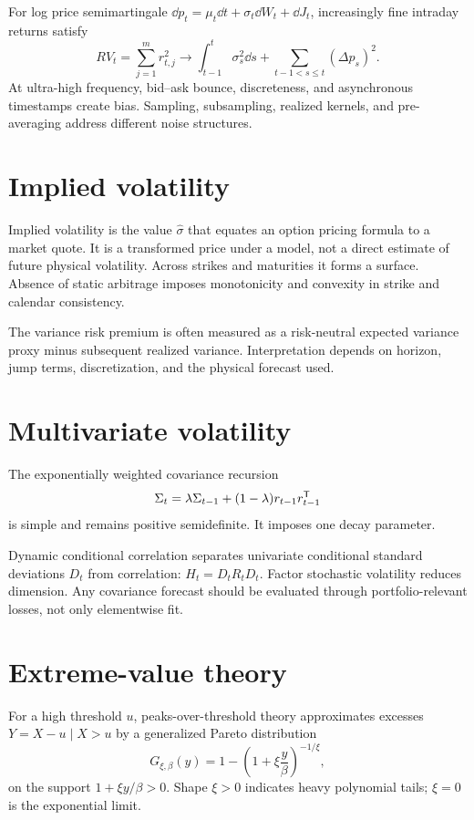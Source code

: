 For log price semimartingale
$\dd p_t=\mu_t\dd t+\sigma_t\dd W_t+\dd J_t$, increasingly fine intraday returns
satisfy
\[
RV_t=\sum_{j=1}^m r_{t,j}^2
\longrightarrow
\int_{t-1}^t\sigma_s^2\dd s+\sum_{t-1<s\leq t}(\Delta p_s)^2.
\]
At ultra-high frequency, bid--ask bounce, discreteness, and asynchronous timestamps
create bias. Sampling, subsampling, realized kernels, and pre-averaging address
different noise structures.

\section{Implied volatility}

Implied volatility is the value $\widehat\sigma$ that equates an option pricing
formula to a market quote. It is a transformed price under a model, not a direct
estimate of future physical volatility. Across strikes and maturities it forms a
surface. Absence of static arbitrage imposes monotonicity and convexity in strike and
calendar consistency.

The variance risk premium is often measured as a risk-neutral expected variance
proxy minus subsequent realized variance. Interpretation depends on horizon, jump
terms, discretization, and the physical forecast used.

\section{Multivariate volatility}

The exponentially weighted covariance recursion
\[
\Sigma_t=\lambda\Sigma_{t-1}
+(1-\lambda)r_{t-1}r_{t-1}^\mathsf T
\]
is simple and remains positive semidefinite. It imposes one decay parameter.

Dynamic conditional correlation separates univariate conditional standard
deviations $D_t$ from correlation:
$H_t=D_tR_tD_t$. Factor stochastic volatility reduces dimension. Any covariance
forecast should be evaluated through portfolio-relevant losses, not only elementwise
fit.

\section{Extreme-value theory}

For a high threshold $u$, peaks-over-threshold theory approximates excesses
$Y=X-u\mid X>u$ by a generalized Pareto distribution
\[
G_{\xi,\beta}(y)=
1-\left(1+\xi\frac y\beta\right)^{-1/\xi},
\]
on the support $1+\xi y/\beta>0$. Shape $\xi>0$ indicates heavy polynomial tails;
$\xi=0$ is the exponential limit.

